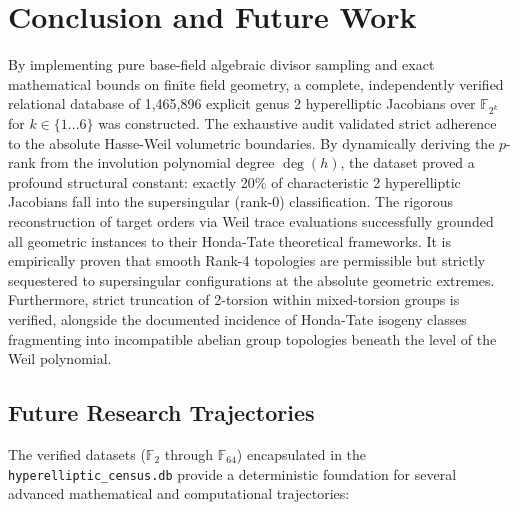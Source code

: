 \documentclass[letterpaper, 11pt]{article}
\begin{document}
	\section{Conclusion and Future Work}
	By implementing pure base-field algebraic divisor sampling and exact mathematical bounds on finite field geometry, a complete, independently verified relational database of 1,465,896 explicit genus 2 hyperelliptic Jacobians over $\mathbb{F}_{2^k}$ for $k \in \{1 \dots 6\}$ was constructed. The exhaustive audit validated strict adherence to the absolute Hasse-Weil volumetric boundaries. By dynamically deriving the $p$-rank from the involution polynomial degree $\deg(h)$, the dataset proved a profound structural constant: exactly 20\% of characteristic 2 hyperelliptic Jacobians fall into the supersingular (rank-0) classification. The rigorous reconstruction of target orders via Weil trace evaluations successfully grounded all geometric instances to their Honda-Tate theoretical frameworks. It is empirically proven that smooth Rank-4 topologies are permissible but strictly sequestered to supersingular configurations at the absolute geometric extremes. Furthermore, strict truncation of 2-torsion within mixed-torsion groups is verified, alongside the documented incidence of Honda-Tate isogeny classes fragmenting into incompatible abelian group topologies beneath the level of the Weil polynomial. 
	
	\subsection{Future Research Trajectories}
	The verified datasets ($\mathbb{F}_2$ through $\mathbb{F}_{64}$) encapsulated in the \texttt{hyperelliptic\_census.db} provide a deterministic foundation for several advanced mathematical and computational trajectories:
	
\end{document}
